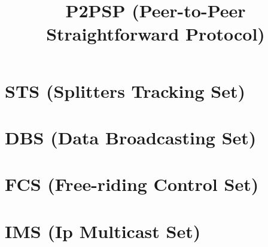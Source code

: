 

\newenvironment{notex}
               {\textbf{Note}:
               }
               {
               }

\title{P2PSP (Peer-to-Peer Straightforward Protocol)}
\maketitle

\begin{abstract}

\end{abstract}

\tableofcontents

\section{STS (Splitters Tracking Set)}


\section{DBS (Data Broadcasting Set)}


\section{FCS (Free-riding Control Set)}


\section{IMS (Ip Multicast Set)}


